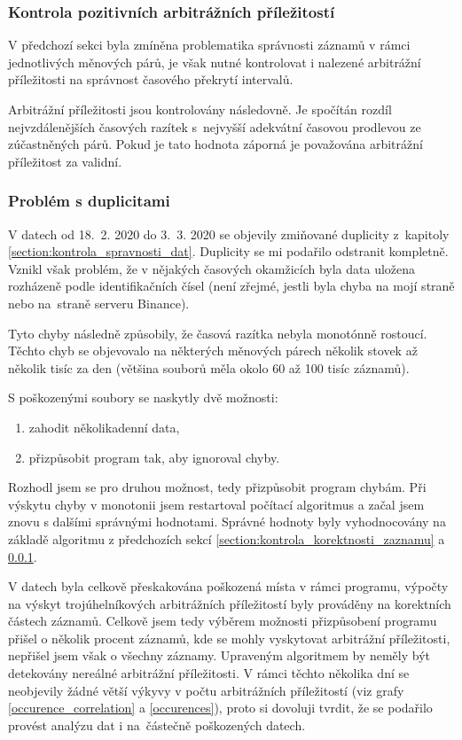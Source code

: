 \documentclass[thesis=B,czech]{FITthesis}[2019/03/21]
\begin{document}
\subsubsection{Kontrola pozitivních arbitrážních příležitostí}
\label{section:kontrola_pozitivnich_arbitraznich_prilezitosti}
V předchozí sekci byla zmíněna problematika správnosti záznamů v rámci jednotlivých měnových párů, je však nutné kontrolovat i nalezené arbitrážní příležitosti na správnost časového překrytí intervalů. 

Arbitrážní příležitosti jsou kontrolovány následovně. Je spočítán rozdíl nejvzdálenějších časových razítek s~nejvyšší adekvátní časovou prodlevou ze zúčastněných párů. Pokud je tato hodnota záporná je považována arbitrážní příležitost za validní.

\subsubsection{Problém s duplicitami}
V datech od 18.~2. 2020 do 3.~3. 2020 se objevily zmiňované duplicity z~kapitoly \ref{section:kontrola_spravnosti_dat}. Duplicity se mi podařilo odstranit kompletně. Vznikl však problém, že v nějakých časových okamžicích byla data uložena rozházeně podle identifikačních čísel (není zřejmé, jestli byla chyba na mojí straně nebo na~straně serveru Binance).

Tyto chyby následně způsobily, že časová razítka nebyla monotónně rostoucí. Těchto chyb se objevovalo na některých měnových párech několik stovek až několik tisíc za den (většina souborů měla okolo 60 až 100 tisíc záznamů). 

S poškozenými soubory se naskytly dvě možnosti:
\begin{enumerate}
    \item zahodit několikadenní data,
    \item přizpůsobit program tak, aby ignoroval chyby.
\end{enumerate}

Rozhodl jsem se pro druhou možnost, tedy přizpůsobit program chybám. Při výskytu chyby v monotonii jsem restartoval počítací algoritmus a začal jsem znovu s dalšími správnými hodnotami. Správné hodnoty byly vyhodnocovány na základě algoritmu z předchozích sekcí \ref{section:kontrola_korektnosti_zaznamu} a \ref{section:kontrola_pozitivnich_arbitraznich_prilezitosti}.

V datech byla celkově přeskakována poškozená místa v rámci programu, výpočty na výskyt trojúhelníkových arbitrážních příležitostí byly prováděny na korektních částech záznamů. Celkově jsem tedy výběrem možnosti přizpůsobení programu přišel o několik procent záznamů, kde se mohly vyskytovat arbitrážní příležitosti, nepřišel jsem však o všechny záznamy. Upraveným algoritmem by neměly být detekovány nereálné arbitrážní příležitosti. V rámci těchto několika dní se neobjevily žádné větší výkyvy v počtu arbitrážních příležitostí (viz grafy \ref{occurence_correlation} a \ref{occurences}), proto si dovoluji tvrdit, že se podařilo provést analýzu dat i na~částečně poškozených datech.
\end{document}
